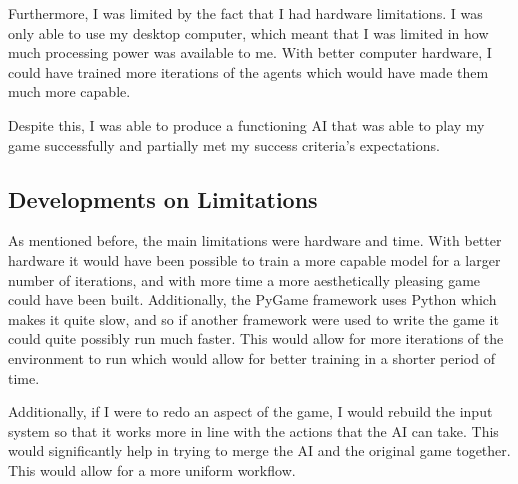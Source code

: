 \vs
Furthermore, I was limited by the fact that I had hardware limitations. I was only able to use my desktop computer, which meant that I was limited in how much processing power was available to me. With better computer hardware, I could have trained more iterations of the agents which would have made them much more capable.

\vs
Despite this, I was able to produce a functioning AI that was able to play my game successfully and partially met my success criteria's expectations.

\subsection{Developments on Limitations}

As mentioned before, the main limitations were hardware and time. With better hardware it would have been possible to train a more capable model for a larger number of iterations, and with more time a more aesthetically pleasing game could have been built. Additionally, the PyGame framework uses Python which makes it quite slow, and so if another framework were used to write the game it could quite possibly run much faster. This would allow for more iterations of the environment to run which would allow for better training in a shorter period of time.

\vs
Additionally, if I were to redo an aspect of the game, I would rebuild the input system so that it works more in line with the actions that the AI can take. This would significantly help in trying to merge the AI and the original game together. This would allow for a more uniform workflow.